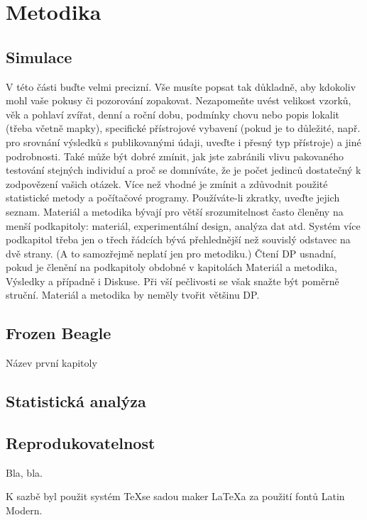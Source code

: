 \chapter{Metodika}

\section{Simulace}

V této části buďte velmi precizní. Vše musíte popsat tak důkladně, aby kdokoliv mohl vaše pokusy či pozorování zopakovat. Nezapomeňte uvést velikost vzorků, věk a pohlaví zvířat, denní a roční dobu, podmínky chovu nebo popis lokalit (třeba včetně mapky), specifické přístrojové vybavení (pokud je to důležité, např. pro srovnání výsledků s publikovanými údaji, uveďte i přesný typ přístroje) a jiné podrobnosti. Také může být dobré zmínit, jak jste zabránili vlivu pakovaného testování stejných
individuí a proč se domníváte, že je počet jedinců dostatečný k zodpovězení vašich otázek. Více než vhodné je zmínit a zdůvodnit použité statistické metody a počítačové programy. Používáte-li zkratky, uveďte jejich seznam.
Materiál a metodika bývají pro větší srozumitelnost často členěny na menší podkapitoly: materiál, experimentální design, analýza dat atd. Systém více podkapitol třeba jen o třech řádcích bývá přehlednější než souvislý odstavec na dvě strany. (A to samozřejmě neplatí jen pro metodiku.) Čtení DP usnadní, pokud je členění na podkapitoly obdobné v kapitolách Materiál a metodika, Výsledky a případně i Diskuse.
Při vší pečlivosti se však snažte být poměrně struční. Materiál a metodika by neměly tvořit většinu DP.

\section{Frozen Beagle}
Název první kapitoly
\section{Statistická analýza}
\section{Reprodukovatelnost}

Bla, bla.

K sazbě byl použit systém \TeX se sadou maker \LaTeX a za použití fontů Latin Modern.
